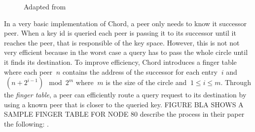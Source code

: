 \begin{figure}
  \centering
	\caption{Adapted from }
\label{fig:chord}
\end{figure}

In a very basic implementation of Chord, a peer only needs to know it successor peer. When a key id is queried each peer is passing it to its successor until it reaches the peer, that is responsible of the key space. However, this is not not very efficient because in the worst case a query has to pass the whole circle until it finds its destination. To improve efficiency, Chord introduces a finger table where each peer $\ n $ contains the address of the successor for each entry $\ i $ and $\ (n + 2^{i-1}) \mod 2^m $ where $\ m $ is the size of the circle and $\ 1 \leq i \leq m$. Through the \textit{finger table}, a peer can efficiently route a query request to its destination by using a known peer that is closer to the queried key. FIGURE BLA SHOWS A SAMPLE FINGER TABLE FOR NODE 80
\citet[\S4.3]{chord} describe the process in their paper the following: .


